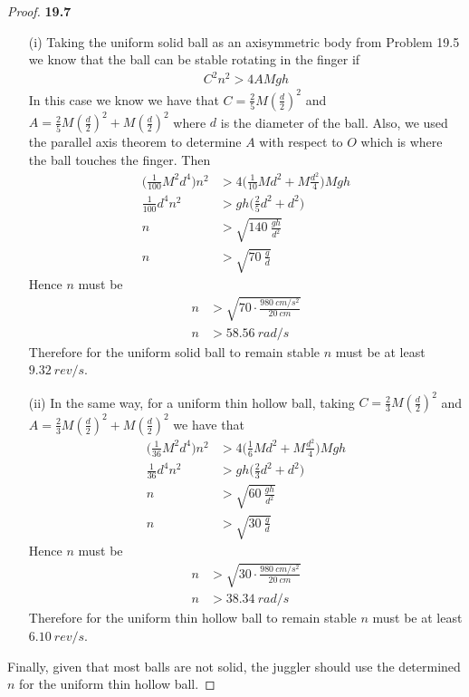 \documentclass[11pt]{article}
\theoremstyle{definition}
\begin{document}
\cleardoublepage
\begin{proof}{\textbf{19.7}}
\begin{itemize}
    \item [(i)] Taking the uniform solid ball as an axisymmetric body from
    Problem 19.5 we know that the ball can be stable rotating in the finger if
    \begin{align*}
        C^2n^2 > 4AMgh
    \end{align*}
    In this case we know we have that $C = \frac{2}{5}M(\frac{d}{2})^2$ and
    $A = \frac{2}{5}M (\frac{d}{2})^2 + M (\frac{d}{2})^2$ where $d$
    is the diameter of the ball.
    Also, we used the parallel axis theorem to determine $A$ with respect to
    $O$ which is where the ball touches the finger. Then
    \begin{align*}
        \bigg(\frac{1}{100}M^2d^4\bigg)n^2
        &> 4\bigg(\frac{1}{10}M d^2 + M \frac{d^2}{4}\bigg)Mgh\\
        \frac{1}{100}d^4n^2 &> gh\bigg(\frac{2}{5}d^2 + d^2\bigg)\\
        n &> \sqrt{140~\frac{gh}{d^2}}\\
        n &> \sqrt{70~\frac{g}{d}}
    \end{align*}
    Hence $n$ must be
    \begin{align*}
        n &> \sqrt{70\cdot\frac{980~cm/s^2}{20~cm}}\\
        n &> 58.56~rad/s
    \end{align*}
    Therefore for the uniform solid ball to remain stable $n$ must
    be at least $9.32~rev/s$.

    \item [(ii)] In the same way, for a uniform thin hollow ball, taking
    $C = \frac{2}{3}M(\frac{d}{2})^2$ and 
    $A = \frac{2}{3}M (\frac{d}{2})^2 + M (\frac{d}{2})^2$
    we have that 
    \begin{align*}
        \bigg(\frac{1}{36}M^2d^4\bigg)n^2
        &> 4\bigg(\frac{1}{6}M d^2 + M \frac{d^2}{4}\bigg)Mgh\\
        \frac{1}{36}d^4n^2 &> gh\bigg(\frac{2}{3}d^2 + d^2\bigg)\\
        n &> \sqrt{60~\frac{gh}{d^2}}\\
        n &> \sqrt{30~\frac{g}{d}}
    \end{align*}
    Hence $n$ must be
    \begin{align*}
        n &> \sqrt{30\cdot\frac{980~cm/s^2}{20~cm}}\\
        n &> 38.34~rad/s
    \end{align*}
    Therefore for the uniform thin hollow ball to remain stable $n$ must
    be at least $6.10~rev/s$.
\end{itemize}
Finally, given that most balls are not solid, the juggler should use the
determined $n$ for the uniform thin hollow ball.
\end{proof}
\end{document}
